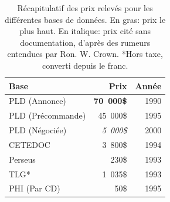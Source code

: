 \begin{table}[h!]
\centering
\begin{tabular}{l|rr}
    \toprule
    Base & Prix & Année \\ \midrule
     PLD (Annonce) & \textbf{70~000\$} & 1990 \\
     PLD (Précommande) & 45~000\$ & 1995 \\
     PLD (Négociée) & \textit{5~000\$} & 2000 \\
     CETEDOC & 3~800\$ & 1994 \\
     Perseus & 230\$ & 1993 \\
     TLG*  & 1~035\$ & 1993 \\
     PHI (Par CD) & 50\$ & 1995 \\ \bottomrule
\end{tabular}
    \caption{Récapitulatif des prix relevés pour les différentes bases de données. En gras: prix le plus haut. En italique: prix cité sans documentation, d'après des rumeurs entendues par Ron. W. Crown. *Hors taxe, converti depuis le franc.}
    \label{tab:chap1:prixcd}
\end{table}

